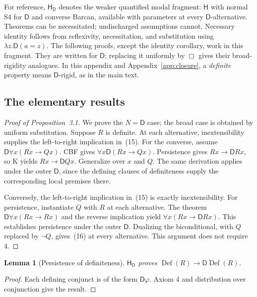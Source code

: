 \documentclass[11pt]{article}
\newtheorem{lemma}[theorem]{Lemma}
\theoremstyle{definition}
\newcommand{\D}{\mathsf D}
\newcommand{\Def}{\operatorname{Def}}
\newcommand{\HD}{\mathsf H_{\D}}
\numberwithin{equation}{section}
\begin{document}
For reference, $\HD$ denotes the weaker quantified modal fragment: $\mathsf H$ with normal S4 for $\D $ and converse Barcan, available with parameters at every $\D $-alternative. Theorems can be necessitated; undischarged assumptions cannot. Necessary identity follows from reflexivity, necessitation, and substitution using $\lambda z.\D (a=z)$. The following proofs, except the identity corollary, work in this fragment. They are written for $\D $; replacing it uniformly by $\Box$ gives their broad-rigidity analogues. In this appendix and Appendix~\ref{app:closure}, a \emph{definite} property means $\D $-rigid, as in the main text.

\subsection{The elementary results}


\begin{proof}[Proof of Proposition~3.1]
We prove the $N=\D $ case; the broad case is obtained by uniform substitution. Suppose $R$ is definite. At each alternative, inextensibility supplies the left-to-right implication in~\textup{(15)}. For the converse, assume $\D\forall x(Rx\rightarrow Qx)$. CBF gives $\forall x\D(Rx\rightarrow Qx)$. Persistence gives $Rx\rightarrow\D Rx$, so K yields $Rx\rightarrow\D Qx$. Generalize over $x$ and $Q$. The same derivation applies under the outer $\D $, since the defining clauses of definiteness supply the corresponding local premises there.

Conversely, the left-to-right implication in~\textup{(15)} is exactly inextensibility. For persistence, instantiate $Q$ with $R$ at each alternative. The theorem $\D\forall x(Rx\rightarrow Rx)$ and the reverse implication yield $\forall x(Rx\rightarrow\D Rx)$. This establishes persistence under the outer $\D $. Dualizing the biconditional, with $Q$ replaced by $\neg Q$, gives~\textup{(16)} at every alternative. This argument does not require 4.
\end{proof}

\begin{lemma}[Persistence of definiteness]\label{lem:rigrig}
$\HD$ proves $\Def(R)\rightarrow\D\Def(R)$.
\end{lemma}
\begin{proof}
Each defining conjunct is of the form $\D\varphi$. Axiom 4 and distribution over conjunction give the result.
\end{proof}
\end{document}
